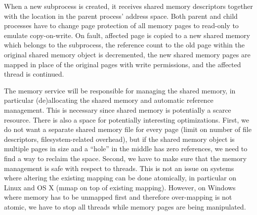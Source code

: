 When a new subprocess is created, it receives shared memory descriptors
together with the location in the parent process' address space. Both
parent and child processes have to change page protection of all memory
pages to read-only to emulate copy-on-write. On fault, affected page is
copied to a new shared memory which belongs to the subprocess, the
reference count to the old page within the original shared memory object
is decremented, the new shared memory pages are mapped in place of the
original pages with write permissions, and the affected thread is
continued.

The memory service will be responsible for managing the shared memory,
in particular (de)allocating the shared memory and automatic reference
management. This is necessary since shared memory is potentially a
scarce resource. There is also a space for potentially interesting
optimizations. First, we do not want a separate shared memory file for
every page (\eg limit on number of file descriptors, filesystem-related
overhead), but if the shared memory object is multiple pages in size and
a ``hole'' in the middle has zero references, we need to find a way to
reclaim the space. Second, we have to make sure that the memory
management is safe with respect to threads. This is not an issue on
systems where altering the existing mapping can be done atomically, in
particular on Linux and OS X (\ie mmap on top of existing mapping).
However, on Windows where memory has to be unmapped first and therefore
over-mapping is not atomic, we have to stop all threads while memory
pages are being manipulated.


